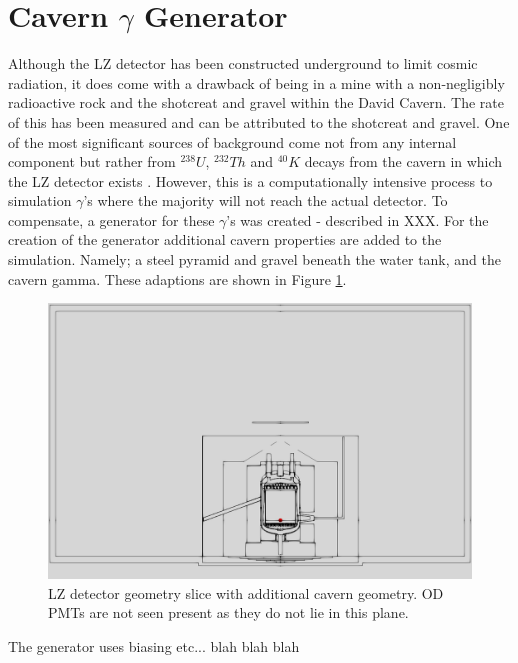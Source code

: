 \section{Cavern $\gamma$ Generator}

\par
Although the LZ detector has been constructed underground to limit cosmic radiation, it does come with a drawback of being in a mine with a non-negligibly radioactive rock and the shotcreat and gravel within the David Cavern.
The rate of this has been measured and can be attributed to the shotcreat and gravel. 
One of the most significant sources of background come not from any internal component but rather from $^{238}U$, $^{232}Th$ and $^{40}K$ decays from the cavern in which the LZ detector exists \cite{LZ_Gamma_Ray_Background_ref}.
However, this is a computationally intensive process to simulation $\gamma$'s where the majority will not reach the actual detector.
To compensate, a generator for these $\gamma$'s was created - described in XXX.
For the creation of the generator additional cavern properties are added to the simulation.
Namely; a steel pyramid and gravel beneath the water tank, and the cavern gamma. 
These adaptions are shown in Figure \ref{fig:Cavern_Geometry}.

\begin{figure}[!htbp]
\includegraphics[width=\textwidth]{Figures/Simulations/cavern_geometry_2.png}
\centering
\caption{LZ detector geometry slice with additional cavern geometry. OD PMTs are not seen present as they do not lie in this plane.}
\label{fig:Cavern_Geometry}
\end{figure}

\par
The generator uses biasing etc... blah blah blah


